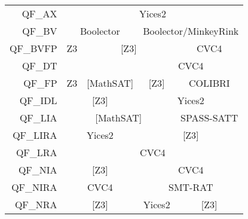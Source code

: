 \begin{table}
{\begin{tabular}{|rcccc|}
\multicolumn{1}{|r|}{QF\_AX}     & \multicolumn{4}{c|}{Yices2}                                                                                                                 \\ \cline{2-5}
\multicolumn{1}{|r|}{QF\_BV}     & \multicolumn{2}{c|}{Boolector}                                      & \multicolumn{2}{c|}{Boolector/MinkeyRink}                             \\ \cline{2-5}
\multicolumn{1}{|r|}{QF\_BVFP}   & \multicolumn{1}{c|}{Z3}       & \multicolumn{2}{c|}{{[}Z3{]}}                                       & \multicolumn{1}{c|}{CVC4}             \\ \cline{2-5}
QF\_DT                           & \multicolumn{1}{l}{}          & \multicolumn{1}{l|}{}               & \multicolumn{2}{c|}{CVC4}                                             \\ \cline{2-5}
\multicolumn{1}{|r|}{QF\_FP}     & \multicolumn{1}{c|}{Z3}       & \multicolumn{1}{c|}{{[}MathSAT{]}}  & \multicolumn{1}{c|}{{[}Z3{]}} & \multicolumn{1}{c|}{COLIBRI}          \\ \cline{2-5}
\multicolumn{1}{|r|}{QF\_IDL}    & \multicolumn{2}{c|}{{[}Z3{]}}                                       & \multicolumn{2}{c|}{Yices2}                                           \\ \cline{2-5}
\multicolumn{1}{|r|}{QF\_LIA}    & \multicolumn{3}{c|}{{[}MathSAT{]}}                                                                  & \multicolumn{1}{c|}{SPASS-SATT}       \\ \cline{2-5}
\multicolumn{1}{|r|}{QF\_LIRA}   & \multicolumn{2}{c|}{Yices2}                                         & \multicolumn{2}{c|}{{[}Z3{]}}                                         \\ \cline{2-5}
\multicolumn{1}{|r|}{QF\_LRA}    & \multicolumn{4}{c|}{CVC4}                                                                                                                   \\ \cline{2-5}
\multicolumn{1}{|r|}{QF\_NIA}    & \multicolumn{2}{c|}{{[}Z3{]}}                                       & \multicolumn{2}{c|}{CVC4}                                             \\ \cline{2-5}
\multicolumn{1}{|r|}{QF\_NIRA}   & \multicolumn{2}{c|}{CVC4}                                           & \multicolumn{2}{c|}{SMT-RAT}                                          \\ \cline{2-5}
\multicolumn{1}{|r|}{QF\_NRA}    & \multicolumn{2}{c|}{{[}Z3{]}}                                       & \multicolumn{1}{c|}{Yices2}   & \multicolumn{1}{c|}{{[}Z3{]}}         \\ \cline{2-5}

\end{tabular}}
\end{table}
